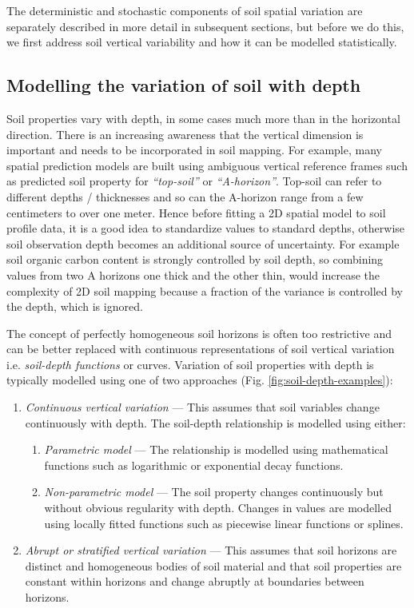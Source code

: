 \documentclass[11pt]{krantz}
\theoremstyle{definition}
\theoremstyle{definition}
\theoremstyle{definition}
\theoremstyle{remark}
\begin{document}
The deterministic and stochastic components of soil spatial variation
are separately described in more detail in subsequent sections, but
before we do this, we first address soil vertical variability and how it
can be modelled statistically.

\hypertarget{soil-depth-models}{%
\subsection{Modelling the variation of soil with
depth}\label{soil-depth-models}}

Soil properties vary with depth, in some cases much more than in the
horizontal direction. There is an increasing awareness that the vertical
dimension is important and needs to be incorporated in soil mapping. For
example, many spatial prediction models are built using ambiguous
vertical reference frames such as predicted soil property for
\emph{``top-soil''} or \emph{``A-horizon''}. Top-soil can refer to
different depths / thicknesses and so can the A-horizon range from a few
centimeters to over one meter. Hence before fitting a 2D spatial model
to soil profile data, it is a good idea to standardize values to
standard depths, otherwise soil observation depth becomes an additional
source of uncertainty. For example soil organic carbon content is
strongly controlled by soil depth, so combining values from two A
horizons one thick and the other thin, would increase the complexity of
2D soil mapping because a fraction of the variance is controlled by the
depth, which is ignored.

The concept of perfectly homogeneous soil horizons is often too
restrictive and can be better replaced with continuous representations
of soil vertical variation i.e. \emph{soil-depth functions} or curves.
Variation of soil properties with depth is typically modelled using one
of two approaches (Fig. \ref{fig:soil-depth-examples}):

\begin{enumerate}
\def\labelenumi{\arabic{enumi}.}
\item
  \emph{Continuous vertical variation} --- This assumes that soil
  variables change continuously with depth. The soil-depth relationship
  is modelled using either:

  \begin{enumerate}
  \def\labelenumii{\arabic{enumii}.}
  \item
    \emph{Parametric model} --- The relationship is modelled using
    mathematical functions such as logarithmic or exponential decay
    functions.
  \item
    \emph{Non-parametric model} --- The soil property changes
    continuously but without obvious regularity with depth. Changes in
    values are modelled using locally fitted functions such as piecewise
    linear functions or splines.
  \end{enumerate}
\item
  \emph{Abrupt or stratified vertical variation} --- This assumes that
  soil horizons are distinct and homogeneous bodies of soil material and
  that soil properties are constant within horizons and change abruptly
  at boundaries between horizons.
\end{enumerate}
\end{document}
